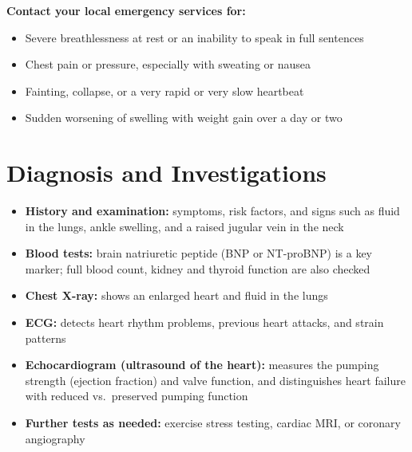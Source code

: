 \textbf{Contact your local emergency services for:}
\begin{itemize}
    \item Severe breathlessness at rest or an inability to speak in full sentences
    \item Chest pain or pressure, especially with sweating or nausea
    \item Fainting, collapse, or a very rapid or very slow heartbeat
    \item Sudden worsening of swelling with weight gain over a day or two
\end{itemize}

\section*{Diagnosis and Investigations}
\begin{itemize}
    \item \textbf{History and examination:} symptoms, risk factors, and signs such as fluid in the lungs, ankle swelling, and a raised jugular vein in the neck
    \item \textbf{Blood tests:} brain natriuretic peptide (BNP or NT-proBNP) is a key marker; full blood count, kidney and thyroid function are also checked
    \item \textbf{Chest X-ray:} shows an enlarged heart and fluid in the lungs
    \item \textbf{ECG:} detects heart rhythm problems, previous heart attacks, and strain patterns
    \item \textbf{Echocardiogram (ultrasound of the heart):} measures the pumping strength (ejection fraction) and valve function, and distinguishes heart failure with reduced vs.\ preserved pumping function
    \item \textbf{Further tests as needed:} exercise stress testing, cardiac MRI, or coronary angiography
\end{itemize}

